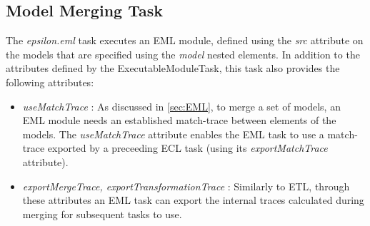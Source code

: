 \subsection{Model Merging Task}

The \emph{epsilon.eml} task executes an EML module, defined using the \emph{src} attribute on the models that are specified using the \emph{model} nested elements. In addition to the attributes defined by the ExecutableModuleTask, this task also provides the following attributes:

\begin{itemize}
	\item \emph{useMatchTrace} : As discussed in \ref{sec:EML}, to merge a set of models, an EML module needs an established match-trace between elements of the models. The \emph{useMatchTrace} attribute enables the EML task to use a match-trace exported by a preceeding ECL task (using its \emph{exportMatchTrace} attribute).
	\item \emph{exportMergeTrace, exportTransformationTrace} : Similarly to ETL, through these attributes an EML task can export the internal traces calculated during merging for subsequent tasks to use.
\end{itemize}
